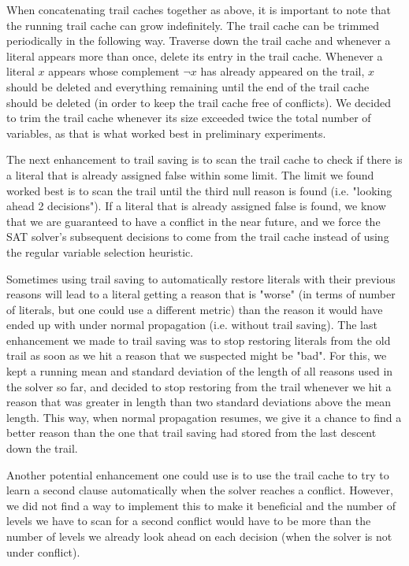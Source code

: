 \documentclass{article}
\begin{document}
When concatenating trail caches together as above, it is important to note that the running trail cache can grow indefinitely. The trail cache can be trimmed periodically in the following way. Traverse down the trail cache and whenever a literal appears more than once, delete its entry in the trail cache. Whenever a literal $x$ appears whose complement $\lnot x$ has already appeared on the trail, $x$ should be deleted and everything remaining until the end of the trail cache should be deleted (in order to keep the trail cache free of conflicts).  We decided to trim the trail cache whenever its size exceeded twice the total number of variables, as that is what worked best in preliminary experiments.\newline

The next enhancement to trail saving is to scan the trail cache to check if there is a literal that is already assigned false within some limit. The limit we found worked best is to scan the trail until the third null reason is found (i.e. "looking ahead 2 decisions"). If a literal that is already assigned false is found, we know that we are guaranteed to have a conflict in the near future, and we force the SAT solver's subsequent decisions to come from the trail cache instead of using the regular variable selection heuristic.

Sometimes using trail saving to automatically restore literals with their previous reasons will lead to a literal getting a reason that is "worse" (in terms of number of literals, but one could use a different metric) than the reason it would have ended up with under normal propagation (i.e. without trail saving). The last enhancement we made to trail saving was to stop restoring literals from the old trail as soon as we hit a reason that we suspected might be "bad". For this, we kept a running mean and standard deviation of the length of all reasons used in the solver so far, and decided to stop restoring from the trail whenever we hit a reason that was greater in length than two standard deviations above the mean length. This way, when normal propagation resumes, we give it a chance to find a better reason than the one that trail saving had stored from the last descent down the trail.

Another potential enhancement one could use is to use the trail cache to try to learn a second clause automatically when the solver reaches a conflict. However, we did not find a way to implement this to make it beneficial and the number of levels we have to scan for a second conflict would have to be more than the number of levels we already look ahead on each decision (when the solver is not under conflict).
\end{document}
